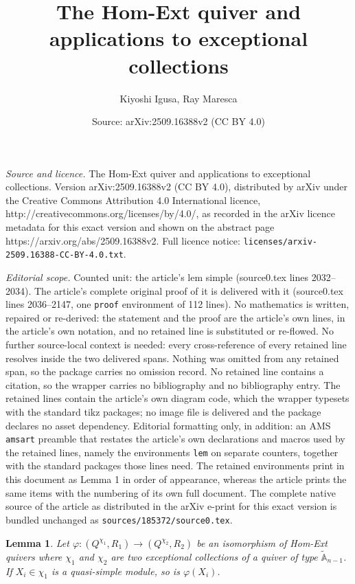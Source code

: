 \documentclass[10pt,a4paper]{amsart}
\title{The Hom-Ext quiver and applications to exceptional collections}
\author{Kiyoshi Igusa, Ray Maresca}
\date{Source: arXiv:2509.16388v2 (CC BY 4.0)}
\newtheorem{lem}{Lemma}
\begin{document}
\maketitle

\noindent\emph{Source and licence.} The Hom-Ext quiver and applications to exceptional collections. Version arXiv:2509.16388v2 (CC BY 4.0), distributed by arXiv under the Creative Commons Attribution 4.0 International licence, http://creativecommons.org/licenses/by/4.0/, as recorded in the arXiv licence metadata for this exact version and shown on the abstract page https://arxiv.org/abs/2509.16388v2. Full licence notice: \texttt{licenses/arxiv-2509.16388-CC-BY-4.0.txt}.\par\smallskip

\noindent\textit{Editorial scope.} Counted unit: the article's lem simple (source0.tex lines 2032--2034). The article's complete original proof of it is delivered with it (source0.tex lines 2036--2147, one \texttt{proof} environment of 112 lines). No mathematics is written, repaired or re-derived: the statement and the proof are the article's own lines, in the article's own notation, and no retained line is substituted or re-flowed.  No further source-local context is needed: every cross-reference of every retained line resolves inside the two delivered spans.  Nothing was omitted from any retained span, so the package carries no omission record.  No retained line contains a citation, so the wrapper carries no bibliography and no bibliography entry.  The retained lines contain the article's own diagram code, which the wrapper typesets with the standard tikz packages; no image file is delivered and the package declares no asset dependency.  Editorial formatting only, in addition: an AMS \texttt{amsart} preamble that restates the article's own declarations and macros used by the retained lines, namely the environments \texttt{lem} on separate counters, together with the standard packages those lines need.  The retained environments print in this document as Lemma 1 in order of appearance, whereas the article prints the same items with the numbering of its own full document.  The complete native source of the article as distributed in the arXiv e-print for this exact version is bundled unchanged as \texttt{sources/185372/source0.tex}.
\begin{lem}\label{lem: iso sends simple to simple}
    Let $\varphi:(Q^{\chi_1},R_1) \rightarrow (Q^{\chi_2},R_2)$ be an isomorphism of Hom-Ext quivers where $\chi_1$ and $\chi_2$ are two exceptional collections of a quiver of type $\tilde{\mathbb{A}}_{n-1}$. If $X_i \in \chi_1$ is a quasi-simple module, so is $\varphi(X_i)$.
\end{lem}
\end{document}
